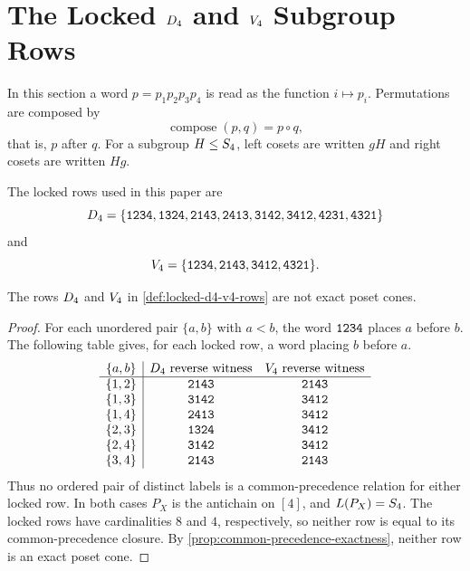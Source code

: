 \section{The Locked \texorpdfstring{\(D_4\)}{D4} and \texorpdfstring{\(V_4\)}{V4} Subgroup Rows}
\label{sec:d4-v4}

\begin{definition}
\label{def:composition-convention}
In this section a word \(p=p_1p_2p_3p_4\) is read as the function \(i\mapsto p_i\). Permutations are composed by
\[
  \operatorname{compose}(p,q)=p\circ q,
\]
that is, \(p\) after \(q\). For a subgroup \(H\le S_4\), left cosets are written \(gH\) and right cosets are written \(Hg\).
\end{definition}

\begin{definition}
\label{def:locked-d4-v4-rows}
The locked rows used in this paper are
\[
D_4=\{\texttt{1234},\texttt{1324},\texttt{2143},\texttt{2413},\texttt{3142},\texttt{3412},\texttt{4231},\texttt{4321}\}
\]
and
\[
V_4=\{\texttt{1234},\texttt{2143},\texttt{3412},\texttt{4321}\}.
\]
\end{definition}

\begin{corollary}
\label{cor:d4-v4-not-poset-cones}
The rows \(D_4\) and \(V_4\) in \cref{def:locked-d4-v4-rows} are not exact poset cones.
\end{corollary}

\begin{proof}
For each unordered pair \(\{a,b\}\) with \(a<b\), the word \(\texttt{1234}\) places \(a\) before \(b\). The following table gives, for each locked row, a word placing \(b\) before \(a\).
\[
\begin{array}{c|cc}
\{a,b\} & D_4\text{ reverse witness} & V_4\text{ reverse witness}\\
\hline
\{1,2\} & \texttt{2143} & \texttt{2143}\\
\{1,3\} & \texttt{3142} & \texttt{3412}\\
\{1,4\} & \texttt{2413} & \texttt{3412}\\
\{2,3\} & \texttt{1324} & \texttt{3412}\\
\{2,4\} & \texttt{3142} & \texttt{3412}\\
\{3,4\} & \texttt{2143} & \texttt{2143}
\end{array}
\]
Thus no ordered pair of distinct labels is a common-precedence relation for either locked row. In both cases \(P_X\) is the antichain on \([4]\), and \(L(P_X)=S_4\). The locked rows have cardinalities \(8\) and \(4\), respectively, so neither row is equal to its common-precedence closure. By \cref{prop:common-precedence-exactness}, neither row is an exact poset cone.
\end{proof}

